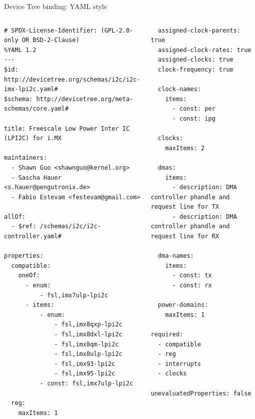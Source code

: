 \begin{frame}[fragile]{Device Tree binding: YAML style}
  \begin{columns}[t]
    \begin{block}{}
      {\fontsize{5}{5}\selectfont
\begin{verbatim}
# SPDX-License-Identifier: (GPL-2.0-only OR BSD-2-Clause)
%YAML 1.2
---
$id: http://devicetree.org/schemas/i2c/i2c-imx-lpi2c.yaml#
$schema: http://devicetree.org/meta-schemas/core.yaml#

title: Freescale Low Power Inter IC (LPI2C) for i.MX

maintainers:
  - Shawn Guo <shawnguo@kernel.org>
  - Sascha Hauer <s.hauer@pengutronix.de>
  - Fabio Estevam <festevam@gmail.com>

allOf:
  - $ref: /schemas/i2c/i2c-controller.yaml#

properties:
  compatible:
    oneOf:
      - enum:
          - fsl,imx7ulp-lpi2c
      - items:
          - enum:
              - fsl,imx8qxp-lpi2c
              - fsl,imx8dxl-lpi2c
              - fsl,imx8qm-lpi2c
              - fsl,imx8ulp-lpi2c
              - fsl,imx93-lpi2c
              - fsl,imx95-lpi2c
          - const: fsl,imx7ulp-lpi2c

  reg:
    maxItems: 1

\end{verbatim}
      }
    \end{block}
    \begin{block}{}
      {\fontsize{5}{5}\selectfont
\begin{verbatim}
  assigned-clock-parents: true
  assigned-clock-rates: true
  assigned-clocks: true
  clock-frequency: true

  clock-names:
    items:
      - const: per
      - const: ipg

  clocks:
    maxItems: 2

  dmas:
    items:
      - description: DMA controller phandle and request line for TX
      - description: DMA controller phandle and request line for RX

  dma-names:
    items:
      - const: tx
      - const: rx

  power-domains:
    maxItems: 1

required:
  - compatible
  - reg
  - interrupts
  - clocks

unevaluatedProperties: false
\end{verbatim}
      }
    \end{block}
  \end{columns}
\end{frame}

